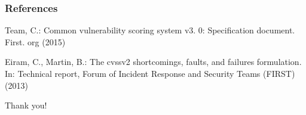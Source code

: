 \documentclass{beamer}
\begin{document}
\begin{frame}
\frametitle{References}

\begin{thebibliography}{99} %
Team, C.: Common vulnerability scoring system v3. 0: Specification document.
  First. org  (2015)
  
Eiram, C., Martin, B.: The cvssv2 shortcomings, faults, and failures
  formulation. In: Technical report, Forum of Incident Response and Security
  Teams (FIRST) (2013)
  
\end{thebibliography}
\end{frame}


\begin{frame}
\Huge{\centerline{Thank you!}}
\end{frame}
\end{document}
